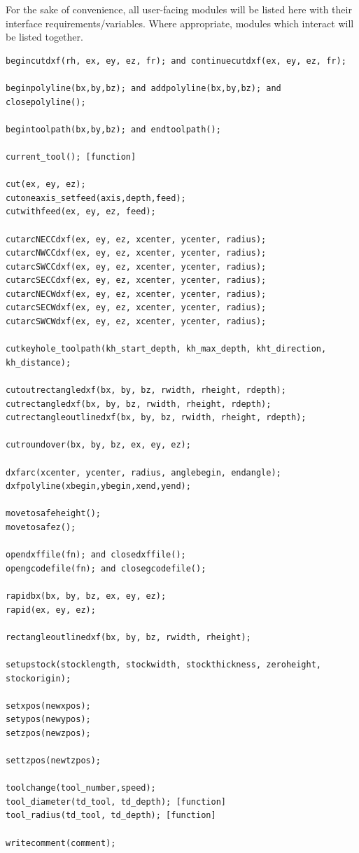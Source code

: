 \documentclass{ltxdoc}
\begin{document}
For the sake of convenience, all user-facing modules will be listed here with their interface
requirements/variables. Where appropriate, modules which interact will be listed together.

\begin{verbatim}
begincutdxf(rh, ex, ey, ez, fr); and continuecutdxf(ex, ey, ez, fr);

beginpolyline(bx,by,bz); and addpolyline(bx,by,bz); and closepolyline();

begintoolpath(bx,by,bz); and endtoolpath();

current_tool(); [function]

cut(ex, ey, ez);
cutoneaxis_setfeed(axis,depth,feed);
cutwithfeed(ex, ey, ez, feed);

cutarcNECCdxf(ex, ey, ez, xcenter, ycenter, radius);
cutarcNWCCdxf(ex, ey, ez, xcenter, ycenter, radius);
cutarcSWCCdxf(ex, ey, ez, xcenter, ycenter, radius);
cutarcSECCdxf(ex, ey, ez, xcenter, ycenter, radius);
cutarcNECWdxf(ex, ey, ez, xcenter, ycenter, radius);
cutarcSECWdxf(ex, ey, ez, xcenter, ycenter, radius);
cutarcSWCWdxf(ex, ey, ez, xcenter, ycenter, radius);

cutkeyhole_toolpath(kh_start_depth, kh_max_depth, kht_direction, kh_distance);

cutoutrectangledxf(bx, by, bz, rwidth, rheight, rdepth);
cutrectangledxf(bx, by, bz, rwidth, rheight, rdepth);
cutrectangleoutlinedxf(bx, by, bz, rwidth, rheight, rdepth);

cutroundover(bx, by, bz, ex, ey, ez);

dxfarc(xcenter, ycenter, radius, anglebegin, endangle);
dxfpolyline(xbegin,ybegin,xend,yend);

movetosafeheight();
movetosafez();

opendxffile(fn); and closedxffile();
opengcodefile(fn); and closegcodefile();

rapidbx(bx, by, bz, ex, ey, ez);
rapid(ex, ey, ez);

rectangleoutlinedxf(bx, by, bz, rwidth, rheight);

setupstock(stocklength, stockwidth, stockthickness, zeroheight, stockorigin);

setxpos(newxpos);
setypos(newypos);
setzpos(newzpos);

settzpos(newtzpos);

toolchange(tool_number,speed);
tool_diameter(td_tool, td_depth); [function]
tool_radius(td_tool, td_depth); [function]

writecomment(comment);
\end{verbatim}
\end{document}
